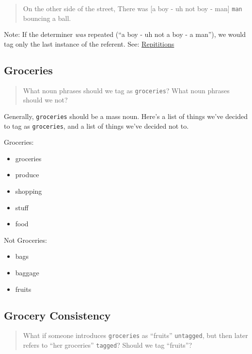 \documentclass[
]{book}
\providecommand{\tightlist}{%
  \setlength{\itemsep}{0pt}\setlength{\parskip}{0pt}}
\begin{document}
\begin{quote}
On the other side of the street,
There was {[}a boy - uh not boy - man{]} \texttt{man} bouncing a ball.
\end{quote}

Note:
If the determiner \emph{was} repeated (``a boy - uh not a boy - a man''),
we would tag only the last instance of the referent.
See: \protect\hyperlink{repititions}{Repititions}

\hypertarget{groceries}{%
\subsection{Groceries}\label{groceries}}

\begin{quote}
What noun phrases should we tag as \texttt{groceries}? What noun phrases should we not?
\end{quote}

Generally, \texttt{groceries} should be a mass noun.
Here's a list of things we've decided to tag as \texttt{groceries}, and a list of things we've decided not to.

Groceries:

\begin{itemize}
\tightlist
\item
  groceries
\item
  produce
\item
  shopping
\item
  stuff
\item
  food
\end{itemize}

Not Groceries:

\begin{itemize}
\tightlist
\item
  bags
\item
  baggage
\item
  fruits
\end{itemize}

\hypertarget{grocery-consistency}{%
\subsection{Grocery Consistency}\label{grocery-consistency}}

\begin{quote}
What if someone introduces \texttt{groceries} as ``fruits'' \texttt{untagged},
but then later refers to ``her groceries'' \texttt{tagged}?
Should we tag ``fruits''?
\end{quote}
\end{document}
